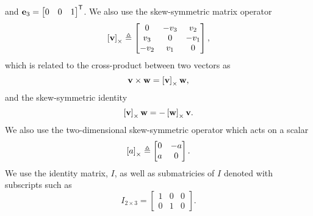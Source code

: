 and $\mathrm{\mathbf{e}}_3 = \begin{bmatrix} 0 & 0 & 1 \end{bmatrix}^{\mathsf{T}}$.
We also use the skew-symmetric matrix operator
\begin{equation}
  \left[ \mathrm{\mathbf{v}} \right]_{\times} \triangleq
  \begin{bmatrix}
  0 & -v_{3} & v_{2}\\
  v_{3} & 0 & -v_{1}\\
  -v_{2} & v_{1} & 0
  \end{bmatrix},
\end{equation}
which is related to the cross-product between two vectors as
\begin{equation}
  \mathrm{\mathbf{v}}\times\mathrm{\mathbf{w}}=\left[ \mathrm{\mathbf{v}} \right]_{\times}\mathrm{\mathbf{w}},
\end{equation}
and the skew-symmetric identity
\begin{equation}
  \left[ \mathrm{\mathbf{v}} \right]_{\times} \mathrm{\mathbf{w}} = -\left[ \mathrm{\mathbf{w}} \right]_{\times} \mathrm{\mathbf{v}}.
\end{equation}
We also use the two-dimensional skew-symmetric operator which acts on a scalar
\begin{equation}
  \left[ a \right]_{\times} \triangleq
  \begin{bmatrix}
  0 & -a \\
  a & 0
  \end{bmatrix}.
\end{equation}
We use the identity matrix, $I$, as well as submatricies of $I$ denoted with
subscripts such as
\begin{equation}
  I_{2 \times 3} =
  \begin{bmatrix}
    1 & 0 & 0 \\
    0 & 1 & 0
  \end{bmatrix}.
\end{equation}
